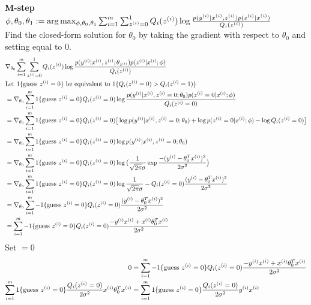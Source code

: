 \documentclass[11pt]{article}
\begin{document}
\textbf{M-step}\\
$\phi,\theta_0,\theta_1 := \arg \max_{\phi,\theta_0,\theta_1} \sum_{i=1}^m \sum_{z^{(i)}=0}^{1} Q_i(z^{(i)}) \log \frac{p(y^{(i)}|x^{(i)},z^{(i)})p(z^{(i)}|x^{(i)})}{Q_i(z^{(i)})}$\\
Find the closed-form solution for $\theta_0$ by taking the gradient with respect to $\theta_0$ and setting equal to $0$.
\begin{align*}
    &\nabla_{\theta_0} \sum_{i=1}^m \sum_{z^{(i)}=0}^{1} Q_i(z^{(i)}) \log \frac{p(y^{(i)}|x^{(i)},z^{(i)};\theta_{z^{(i)}})p(z^{(i)}|x^{(i)};\phi)}{Q_i(z^{(i)})} \\
    &\text{Let $1\{\text{guess } z^{(i)} = 0\}$ be equivalent to $1\{Q_i(z^{(i)} = 0) > Q_i(z^{(i)} = 1)\}$} \\
    &= \nabla_{\theta_0} \sum_{i=1}^m 1\{\text{guess } z^{(i)} = 0\} Q_i(z^{(i)} = 0) \log \frac{p(y^{(i)}|x^{(i)},z^{(i)}=0;\theta_0) p(z^{(i)}=0|x^{(i)};\phi)}{Q_i(z^{(i)}=0)} \\
    &= \nabla_{\theta_0} \sum_{i=1}^m 1\{\text{guess } z^{(i)} = 0\} Q_i(z^{(i)} = 0) \big[ \log p(y^{(i)}|x^{(i)},z^{(i)}=0;\theta_0) + \log p(z^{(i)}=0|x^{(i)};\phi) - \log Q_i(z^{(i)}=0) \big] \\
    &= \nabla_{\theta_0} \sum_{i=1}^m 1\{\text{guess } z^{(i)} = 0\} Q_i(z^{(i)}=0) \log p(y^{(i)}|x^{(i)},z^{(i)}=0;\theta_0) \\
    &= \nabla_{\theta_0} \sum_{i=1}^m 1\{\text{guess } z^{(i)} = 0\} Q_i(z^{(i)}=0) \log \big( \frac{1}{\sqrt{2 \pi} \sigma} \exp{\frac{-(y^{(i)}-\theta_0^T x^{(i)})^2}{2 \sigma^2}}\big) \\
    &= \nabla_{\theta_0} \sum_{i=1}^m 1\{\text{guess } z^{(i)} = 0\} Q_i(z^{(i)}=0) \log \frac{1}{\sqrt{2 \pi} \sigma} - Q_i(z^{(i)}=0) \frac{(y^{(i)}-\theta_0^T x^{(i)})^2}{2 \sigma^2} \\
    &= \nabla_{\theta_0} \sum_{i=1}^m - 1\{\text{guess } z^{(i)} = 0\} Q_i(z^{(i)}=0) \frac{(y^{(i)}-\theta_0^T x^{(i)})^2}{2 \sigma^2} \\
    &= \sum_{i=1}^m - 1\{\text{guess } z^{(i)} = 0\} Q_i(z^{(i)}=0) \frac{-y^{(i)} x^{(i)} + x^{(i)} \theta_0^T x^{(i)}}{2 \sigma^2} \\
\end{align*}
Set $= 0$ \\
\begin{align*}
    0 &= \sum_{i=1}^m - 1\{\text{guess } z^{(i)} = 0\} Q_i(z^{(i)}=0) \frac{-y^{(i)} x^{(i)} + x^{(i)} \theta_0^T x^{(i)}}{2 \sigma^2} \\
    \sum_{i=1}^m 1\{\text{guess } z^{(i)} = 0\} \frac{Q_i(z^{(i)} = 0)}{2 \sigma^2} x^{(i)} \theta_0^T x^{(i)} &= \sum_{i=1}^m 1\{\text{guess } z^{(i)} = 0\} \frac{Q_i(z^{(i)} = 0)}{2 \sigma^2} y^{(i)} x^{(i)} \\
\end{align*}
\end{document}

